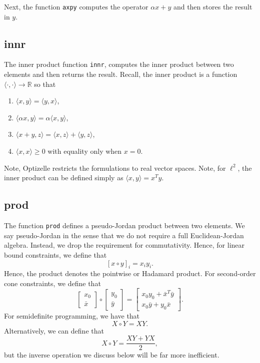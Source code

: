 \documentclass{report}
\newcommand{\re}{\mathbb{R}}
\begin{document}
        Next, the function \texttt{axpy} computes the operator $\alpha x + y$ and then stores the result in $y$.

\subsection{innr}

        The inner product function \texttt{innr}, computes the inner product between two elements and then returns the result.  Recall, the inner product is a function $\langle \cdot,\cdot \rangle\rightarrow \re$ so that
\begin{enumerate}
    \item $\langle x,y\rangle = \langle y,x \rangle$,
    \item $\langle \alpha x,y\rangle = \alpha \langle x,y\rangle$,
    \item $\langle x+y,z\rangle = \langle x,z\rangle + \langle y,z\rangle$,
    \item $\langle x,x\rangle\geq 0$ with equality only when $x=0$.
\end{enumerate}
Note, Optizelle restricts the formulations to real vector spaces.  Note, for $\ell^2$, the inner product can be defined simply as $\langle x,y\rangle=x^Ty$.

\subsection{prod}

        The function \texttt{prod} defines a pseudo-Jordan product between two elements.  We say pseudo-Jordan in the sense that we do not require a full Euclidean-Jordan algebra.  Instead, we drop the requirement for commutativity.  Hence, for linear bound constraints, we define that
$$
        [x\circ y]_i = x_iy_i.
$$
Hence, the product denotes the pointwise or Hadamard product.  For second-order cone constraints, we define that
$$
        \begin{bmatrix}x_0\\\bar{x}\end{bmatrix} \circ \begin{bmatrix}y_0\\\bar{y}\end{bmatrix}=\begin{bmatrix} x_0y_0 + \bar{x}^T\bar{y}\\x_0 \bar{y} + y_0 \bar{x}\end{bmatrix}.
$$
For semidefinite programming, we have that
$$
        X\circ Y = XY.
$$
Alternatively, we can define that
$$
        X\circ Y = \frac{XY + YX}{2},
$$
but the inverse operation we discuss below will be far more inefficient.
\end{document}
